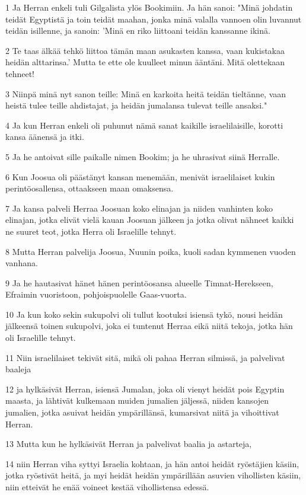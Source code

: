 \par 1 Ja Herran enkeli tuli Gilgalista ylös Bookimiin. Ja hän sanoi: "Minä johdatin teidät Egyptistä ja toin teidät maahan, jonka minä valalla vannoen olin luvannut teidän isillenne, ja sanoin: 'Minä en riko liittoani teidän kanssanne ikinä.
\par 2 Te taas älkää tehkö liittoa tämän maan asukasten kanssa, vaan kukistakaa heidän alttarinsa.' Mutta te ette ole kuulleet minun ääntäni. Mitä olettekaan tehneet!
\par 3 Niinpä minä nyt sanon teille: Minä en karkoita heitä teidän tieltänne, vaan heistä tulee teille ahdistajat, ja heidän jumalansa tulevat teille ansaksi."
\par 4 Ja kun Herran enkeli oli puhunut nämä sanat kaikille israelilaisille, korotti kansa äänensä ja itki.
\par 5 Ja he antoivat sille paikalle nimen Bookim; ja he uhrasivat siinä Herralle.
\par 6 Kun Joosua oli päästänyt kansan menemään, menivät israelilaiset kukin perintöosallensa, ottaakseen maan omaksensa.
\par 7 Ja kansa palveli Herraa Joosuan koko elinajan ja niiden vanhinten koko elinajan, jotka elivät vielä kauan Joosuan jälkeen ja jotka olivat nähneet kaikki ne suuret teot, jotka Herra oli Israelille tehnyt.
\par 8 Mutta Herran palvelija Joosua, Nuunin poika, kuoli sadan kymmenen vuoden vanhana.
\par 9 Ja he hautasivat hänet hänen perintöosansa alueelle Timnat-Herekseen, Efraimin vuoristoon, pohjoispuolelle Gaas-vuorta.
\par 10 Ja kun koko sekin sukupolvi oli tullut kootuksi isiensä tykö, nousi heidän jälkeensä toinen sukupolvi, joka ei tuntenut Herraa eikä niitä tekoja, jotka hän oli Israelille tehnyt.
\par 11 Niin israelilaiset tekivät sitä, mikä oli pahaa Herran silmissä, ja palvelivat baaleja
\par 12 ja hylkäsivät Herran, isiensä Jumalan, joka oli vienyt heidät pois Egyptin maasta, ja lähtivät kulkemaan muiden jumalien jäljessä, niiden kansojen jumalien, jotka asuivat heidän ympärillänsä, kumarsivat niitä ja vihoittivat Herran.
\par 13 Mutta kun he hylkäsivät Herran ja palvelivat baalia ja astarteja,
\par 14 niin Herran viha syttyi Israelia kohtaan, ja hän antoi heidät ryöstäjien käsiin, jotka ryöstivät heitä, ja myi heidät heidän ympärillään asuvien vihollisten käsiin, niin etteivät he enää voineet kestää vihollistensa edessä.
